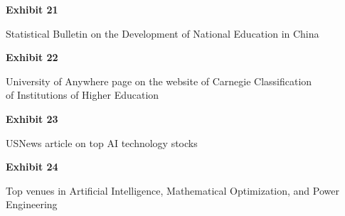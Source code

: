\documentclass{article}
\begin{document}
 

\vspace*{\fill}
\begin{center}
{\LARGE \bf
Exhibit 21
}

\vspace{10\baselineskip}

{\large Statistical Bulletin on the Development of National Education in China}

\end{center}
\vspace*{\fill}




\vspace*{\fill}
\begin{center}
{\LARGE \bf
Exhibit 22
}

\vspace{10\baselineskip}

{\large University of Anywhere page on the website of Carnegie Classification\\ of Institutions of Higher Education}

\end{center}
\vspace*{\fill}


% 



\vspace*{\fill}
\begin{center}
{\LARGE \bf
Exhibit 23
}

\vspace{10\baselineskip}

{\large USNews article on top AI technology stocks}

\end{center}
\vspace*{\fill}


% 



\vspace*{\fill}
\begin{center}
{\LARGE \bf
Exhibit 24
}

\vspace{10\baselineskip}

{\large Top venues in Artificial Intelligence, Mathematical Optimization, and Power Engineering}

\end{center}
\vspace*{\fill}
\end{document}
